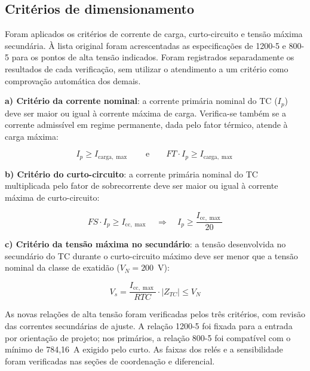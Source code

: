 \subsection{Critérios de dimensionamento}

Foram aplicados os critérios de corrente de carga, curto-circuito e tensão máxima secundária. À lista original foram acrescentadas as especificações de 1200-5 e 800-5 para os pontos de alta tensão indicados. Foram registrados separadamente os resultados de cada verificação, sem utilizar o atendimento a um critério como comprovação automática dos demais.

\textbf{a) Critério da corrente nominal}: a corrente primária nominal do TC ($I_p$) deve ser maior ou igual à corrente máxima de carga. Verifica-se também se a corrente admissível em regime permanente, dada pelo fator térmico, atende à carga máxima:

\begin{equation}
    I_p \geq I_{\mathrm{carga},\max} \qquad \text{e} \qquad FT \cdot I_p \geq I_{\mathrm{carga},\max}
    \label{eq:crit_nominal}
\end{equation}

\textbf{b) Critério do curto-circuito}: a corrente primária nominal do TC multiplicada pelo fator de sobrecorrente deve ser maior ou igual à corrente máxima de curto-circuito:

\begin{equation}
    FS \cdot I_p \geq I_{\mathrm{cc},\max} \quad \Rightarrow \quad I_p \geq \frac{I_{\mathrm{cc},\max}}{20}
    \label{eq:crit_cc}
\end{equation}

\textbf{c) Critério da tensão máxima no secundário}: a tensão desenvolvida no secundário do TC durante o curto-circuito máximo deve ser menor que a tensão nominal da classe de exatidão ($V_N = 200$~V):

\begin{equation}
    V_s = \frac{I_{\mathrm{cc},\max}}{RTC} \cdot |Z_{TC}| \leq V_N
    \label{eq:crit_tensao}
\end{equation}

As novas relações de alta tensão foram verificadas pelos três critérios, com revisão das correntes secundárias de ajuste. A relação 1200-5 foi fixada para a entrada por orientação de projeto; nos primários, a relação 800-5 foi compatível com o mínimo de 784,16~A exigido pelo curto. As faixas dos relés e a sensibilidade foram verificadas nas seções de coordenação e diferencial.

